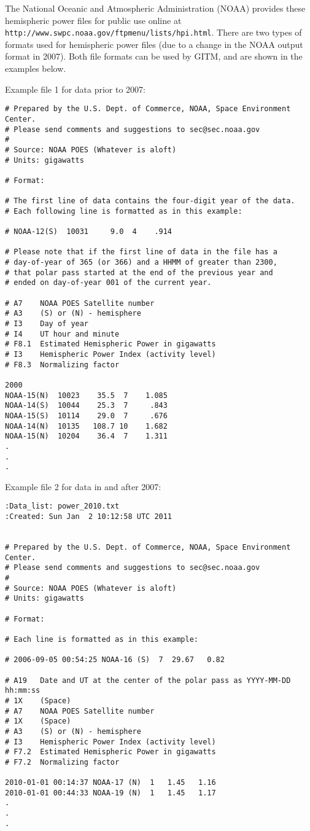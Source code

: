 The National Oceanic and Atmospheric Administration (NOAA) provides these hemispheric power files for public use online at {\tt http://www.swpc.noaa.gov/ftpmenu/lists/hpi.html}.  There are two types of formats used for hemispheric power files (due to a change in the NOAA output format in 2007).  Both file formats can be used by GITM, and are shown in the examples below.

Example file 1 for data prior to 2007:

\begin{verbatim}
# Prepared by the U.S. Dept. of Commerce, NOAA, Space Environment Center.
# Please send comments and suggestions to sec@sec.noaa.gov 
# 
# Source: NOAA POES (Whatever is aloft)
# Units: gigawatts

# Format:

# The first line of data contains the four-digit year of the data.
# Each following line is formatted as in this example:

# NOAA-12(S)  10031     9.0  4    .914

# Please note that if the first line of data in the file has a
# day-of-year of 365 (or 366) and a HHMM of greater than 2300, 
# that polar pass started at the end of the previous year and
# ended on day-of-year 001 of the current year.

# A7    NOAA POES Satellite number
# A3    (S) or (N) - hemisphere
# I3    Day of year
# I4    UT hour and minute
# F8.1  Estimated Hemispheric Power in gigawatts
# I3    Hemispheric Power Index (activity level)
# F8.3  Normalizing factor

2000
NOAA-15(N)  10023    35.5  7    1.085
NOAA-14(S)  10044    25.3  7     .843
NOAA-15(S)  10114    29.0  7     .676
NOAA-14(N)  10135   108.7 10    1.682
NOAA-15(N)  10204    36.4  7    1.311
.
.
.
\end{verbatim}

Example file 2 for data in and after 2007:

\begin{verbatim}
:Data_list: power_2010.txt
:Created: Sun Jan  2 10:12:58 UTC 2011


# Prepared by the U.S. Dept. of Commerce, NOAA, Space Environment Center.
# Please send comments and suggestions to sec@sec.noaa.gov 
# 
# Source: NOAA POES (Whatever is aloft)
# Units: gigawatts

# Format:

# Each line is formatted as in this example:

# 2006-09-05 00:54:25 NOAA-16 (S)  7  29.67   0.82

# A19   Date and UT at the center of the polar pass as YYYY-MM-DD hh:mm:ss
# 1X    (Space)
# A7    NOAA POES Satellite number
# 1X    (Space)
# A3    (S) or (N) - hemisphere
# I3    Hemispheric Power Index (activity level)
# F7.2  Estimated Hemispheric Power in gigawatts
# F7.2  Normalizing factor

2010-01-01 00:14:37 NOAA-17 (N)  1   1.45   1.16
2010-01-01 00:44:33 NOAA-19 (N)  1   1.45   1.17
.
.
.
\end{verbatim}

